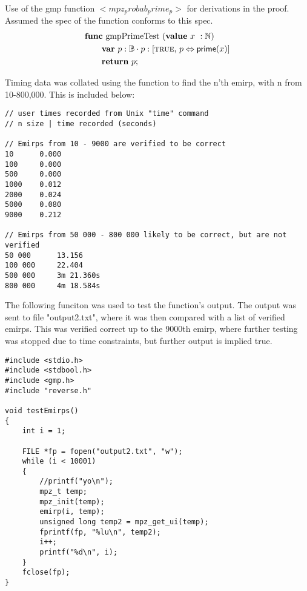 \documentclass[a4paper,10pt,fleqn]{scrartcl}   	%
\newcommand{\Prime}{\mathsf{prime}}
\begin{document}
Use of the gmp function $<mpz_probab_prime_p>$ for derivations in the proof. Assumed the spec of the function conforms to this spec.
\begin{align*}
&\FUNC \text{ gmpPrimeTest }(\VALUE \text{ $x$ }: \nat) \\
	&\qquad \VAR \text{ $p$}: \bool \cdot{} p : [\True, \, p\EQUIV \Prime(x)] \\
	& \qquad \RETURN \text{ $p$};
\end{align*}

Timing data was collated using the function to find the n'th emirp, with n from 10-800,000. This is included below:
\begin{lstlisting}
// user times recorded from Unix "time" command
// n size | time recorded (seconds)

// Emirps from 10 - 9000 are verified to be correct
10      0.000
100     0.000
500     0.000
1000    0.012
2000    0.024
5000    0.080
9000    0.212

// Emirps from 50 000 - 800 000 likely to be correct, but are not verified
50 000      13.156
100 000     22.404
500 000     3m 21.360s
800 000     4m 18.584s
\end{lstlisting}
\newpage
The following funciton was used to test the function's output. The output was sent to file "output2.txt", where it was then compared with a list of verified emirps. This was verified correct up to the 9000th emirp, where further testing was stopped due to time constraints, but further output is implied true. 
\begin{lstlisting}
#include <stdio.h>
#include <stdbool.h>
#include <gmp.h>
#include "reverse.h"

void testEmirps()
{
	int i = 1;

	FILE *fp = fopen("output2.txt", "w");
	while (i < 10001)
	{
		//printf("yo\n");
		mpz_t temp;
		mpz_init(temp);
		emirp(i, temp);
		unsigned long temp2 = mpz_get_ui(temp);
		fprintf(fp, "%lu\n", temp2);
		i++;
		printf("%d\n", i);
	}
	fclose(fp);
}

\end{lstlisting}
\end{document}
